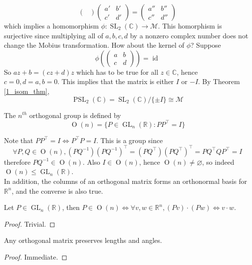 \begin{example}
$$\begin{pmatrix}
    \end{pmatrix}
    \begin{pmatrix}
        a'&b'\\
        c'&d'
    \end{pmatrix}
    =
    \begin{pmatrix}
        a''&b''\\
        c''&d''
    \end{pmatrix}$$
    which implies a homomorphism $\phi:\operatorname{SL}_2(\mathbb C)\to\mathcal{M}$.
    This homorphism is surjective since multiplying all of $a,b,c,d$ by a nonzero complex number does not change the Mobius transformation.
    How about the kernel of $\phi$?
    Suppose
    $$\phi\left(\begin{pmatrix}
        a&b\\
        c&d
    \end{pmatrix}\right)=\operatorname{id}$$
    So $az+b=(cz+d)z$ which has to be true for all $z\in\mathbb C$, hence $c=0,d=a,b=0$.
    This implies that the matrix is either $I$ or $-I$.
    By Theorem \ref{1_isom_thm},
    $$\operatorname{PSL}_2(\mathbb C)=\operatorname{SL}_2(\mathbb C)/\{\pm I\}\cong\mathcal M$$
\end{example}
\begin{definition}
    The $n^{th}$ orthogonal group is defined by
    $$\operatorname{O}(n)=\{P\in\operatorname{GL}_n(\mathbb R):PP^\top=I\}$$
\end{definition}
Note that $PP^\top=I\iff P^\top P=I$.
This is a group since
$$\forall P,Q\in\operatorname{O}(n),(PQ^{-1})(PQ^{-1})^\top=(PQ^\top)(PQ^\top)^\top=PQ^\top QP^\top=I$$
therefore $PQ^{-1}\in \operatorname{O}(n)$.
Also $I\in \operatorname{O}(n)$, hence $\operatorname{O}(n)\neq\varnothing$, so indeed $\operatorname{O}(n)\le \operatorname{GL}_n(\mathbb R)$.\\
In addition, the columns of an orthogonal matrix forms an orthonormal basis for $\mathbb R^n$, and the converse is also true.
\begin{lemma}
    Let $P\in\operatorname{GL}_n(\mathbb R)$, then $P\in \operatorname{O}(n)\iff\forall v,w\in\mathbb R^n, (Pv)\cdot(Pw)\iff v\cdot w$.
\end{lemma}
\begin{proof}
    Trivial.
\end{proof}
\begin{corollary}
    Any orthogonal matrix preserves lengths and angles.
\end{corollary}
\begin{proof}
    Immediate.
\end{proof}
